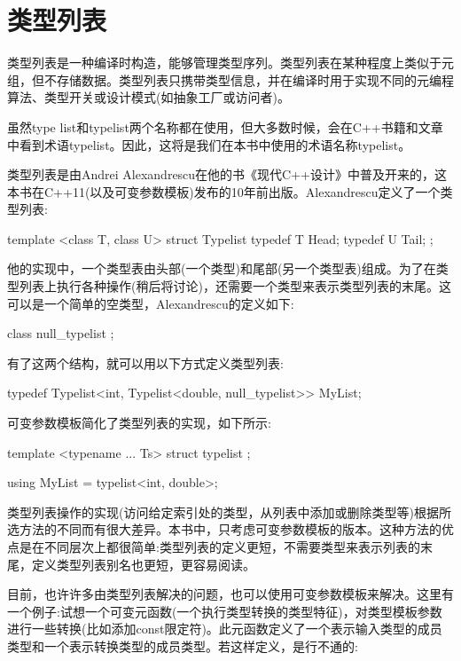 \section{类型列表}

类型列表是一种编译时构造，能够管理类型序列。类型列表在某种程度上类似于元组，但不存储数据。类型列表只携带类型信息，并在编译时用于实现不同的元编程算法、类型开关或设计模式(如抽象工厂或访问者)。

\begin{important}
虽然type list和typelist两个名称都在使用，但大多数时候，会在C++书籍和文章中看到术语typelist。因此，这将是我们在本书中使用的术语名称typelist。
\end{important}

类型列表是由Andrei Alexandrescu在他的书《现代C++设计》中普及开来的，这本书在C++11(以及可变参数模板)发布的10年前出版。Alexandrescu定义了一个类型列表:

\begin{cpp}
template <class T, class U>
struct Typelist
{
	typedef T Head;
	typedef U Tail;
};
\end{cpp}

他的实现中，一个类型表由头部(一个类型)和尾部(另一个类型表)组成。为了在类型列表上执行各种操作(稍后将讨论)，还需要一个类型来表示类型列表的末尾。这可以是一个简单的空类型，Alexandrescu的定义如下:

\begin{cpp}
class null_typelist {};
\end{cpp}

有了这两个结构，就可以用以下方式定义类型列表:

\begin{cpp}
typedef Typelist<int,
				 Typelist<double, null_typelist>> MyList;
\end{cpp}

可变参数模板简化了类型列表的实现，如下所示:

\begin{cpp}
template <typename ... Ts>
struct typelist {};

using MyList = typelist<int, double>;
\end{cpp}

类型列表操作的实现(访问给定索引处的类型，从列表中添加或删除类型等)根据所选方法的不同而有很大差异。本书中，只考虑可变参数模板的版本。这种方法的优点是在不同层次上都很简单:类型列表的定义更短，不需要类型来表示列表的末尾，定义类型列表别名也更短，更容易阅读。

目前，也许许多由类型列表解决的问题，也可以使用可变参数模板来解决。这里有一个例子:试想一个可变元函数(一个执行类型转换的类型特征)，对类型模板参数进行一些转换(比如添加const限定符)。此元函数定义了一个表示输入类型的成员类型和一个表示转换类型的成员类型。若这样定义，是行不通的:

